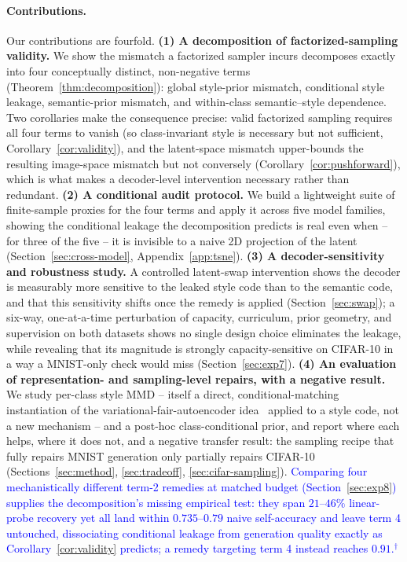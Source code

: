 \documentclass[10pt,letterpaper]{article}
\newcommand{\pj}[1]{\textcolor{blue}{#1$^{\dagger}$}}
\begin{document}
\paragraph{Contributions.}
Our contributions are fourfold.
\textbf{(1) A decomposition of factorized-sampling validity.} We show the
mismatch a factorized sampler incurs decomposes exactly into four
conceptually distinct, non-negative terms
(Theorem~\ref{thm:decomposition}): global style-prior mismatch, conditional
style leakage, semantic-prior mismatch, and within-class semantic--style
dependence. Two corollaries make the consequence precise: valid factorized
sampling requires all four terms to vanish (so class-invariant style is
necessary but not sufficient, Corollary~\ref{cor:validity}), and the
latent-space mismatch upper-bounds the resulting image-space mismatch but
not conversely (Corollary~\ref{cor:pushforward}), which is what makes a
decoder-level intervention necessary rather than redundant.
\textbf{(2) A conditional audit protocol.} We build a lightweight suite of
finite-sample proxies for the four terms and apply it across five model
families, showing the conditional leakage the decomposition predicts is
real even when -- for three of the five -- it is invisible to a naive 2D
projection of the latent (Section~\ref{sec:cross-model},
Appendix~\ref{app:tsne}).
\textbf{(3) A decoder-sensitivity and robustness study.} A controlled
latent-swap intervention shows the decoder is measurably more sensitive to
the leaked style code than to the semantic code, and that this sensitivity
shifts once the remedy is applied (Section~\ref{sec:swap}); a six-way,
one-at-a-time perturbation of capacity, curriculum, prior geometry, and
supervision on both datasets shows no single design choice eliminates the
leakage, while revealing that its magnitude is strongly capacity-sensitive
on CIFAR-10 in a way a MNIST-only check would miss (Section~\ref{sec:exp7}).
\textbf{(4) An evaluation of representation- and sampling-level repairs,
with a negative result.} We study per-class style MMD -- itself a direct,
conditional-matching instantiation of the variational-fair-autoencoder
idea~\citep{louizos2015variational} applied to a style code, not a new
mechanism -- and a post-hoc class-conditional prior, and report where each
helps, where it does not, and a negative transfer result: the sampling
recipe that fully repairs MNIST generation only partially repairs CIFAR-10
(Sections~\ref{sec:method}, \ref{sec:tradeoff}, \ref{sec:cifar-sampling}).
\pj{Comparing four mechanistically different term-2 remedies at matched
budget (Section~\ref{sec:exp8}) supplies the decomposition's missing
empirical test: they span $21$--$46\%$ linear-probe recovery yet all land
within $0.735$--$0.79$ naive self-accuracy and leave term 4 untouched,
dissociating conditional leakage from generation quality exactly as
Corollary~\ref{cor:validity} predicts; a remedy targeting term 4 instead
reaches $0.91$.}
\end{document}

